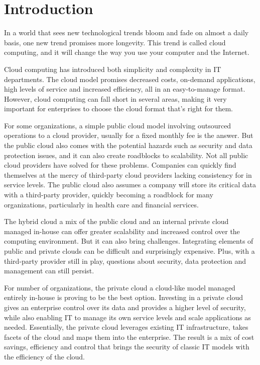 \chapter{Introduction}
\makeatletter

In a world that sees new technological trends bloom and fade on almost a daily basis, one new trend promises more longevity. This trend is called cloud computing, and it will change the way you use your computer and the Internet\cite{miller}.

\par Cloud computing has introduced both simplicity and complexity in IT departments. The cloud model promises decreased costs, on-demand applications, high levels of service and increased efficiency, all in an easy-to-manage format. However, cloud computing can fall short in several areas, making it very important for enterprises to choose the cloud format that’s right for them.

\par For some organizations, a simple public cloud model involving outsourced operations to a cloud provider, usually for a fixed monthly fee is the answer. But the public cloud also comes with the potential hazards such as security and data protection issues, and it can also create roadblocks to scalability. Not all public cloud providers have solved for these problems. Companies can quickly find themselves at the mercy of third-party cloud providers lacking consistency for in service levels. The public cloud also assumes a company will store its critical data with a third-party provider, quickly becoming a roadblock for many organizations, particularly in health care and financial services. 

\par The hybrid cloud a mix of the public cloud and an internal private cloud managed in-house can offer greater scalability and increased control over the computing environment. But it can also bring challenges. Integrating elements of public and private clouds can be difficult and surprisingly expensive. Plus, with a third-party provider still in play, questions about security, data protection and management can still persist. 

\par For number of organizations, the private cloud a cloud-like model managed entirely in-house is proving to be the best option. Investing in a private cloud gives an enterprise control over its data and provides a higher level of security, while also enabling IT to manage its own service levels and scale applications as needed. Essentially, the private cloud leverages existing IT infrastructure, takes facets of the cloud and maps them into the enterprise. The result is a mix of cost savings, efficiency and control that brings the security of classic IT models with the efficiency of the cloud.

